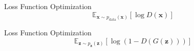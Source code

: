 \documentclass{beamer}
\begin{document}
\begin{frame}{Loss Function Optimization}
\[\mathbb{E}_{\mathbf{x} \sim p_{\text{data}}(\mathbf{x})} [\log D(\mathbf{x})]\]
    \begin{figure}[h]
        \centering
        \captionsetup{labelformat=empty}
    \end{figure}   
\end{frame}

\begin{frame}{Loss Function Optimization}
\[\mathbb{E}_{\mathbf{z} \sim p_{\mathbf{z}}(\mathbf{z})} [\log (1 - D(G(\mathbf{z})))]\]
    \begin{figure}[h]
        \centering
        \captionsetup{labelformat=empty}
    \end{figure}   
\end{frame}
\end{document}
